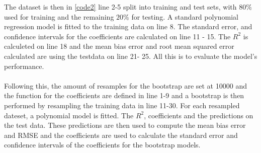 


\noindent The dataset is then in \autoref{code2} line 2-5 split into training and test sets, with $80\%$ used for training and the remaining $20\%$ for testing. A standard polynomial regression model is fitted to the training data on line 8. The standard error, and confidence intervals for the coefficients are calculated on line 11 - 15. The $R^2$ is calculeted on line 18 and  the mean bias error and root mean squared error calculated are using the testdata on line 21- 25. All this is to evaluate the model's performance.
\\\\



\noindent Following this, the amount of resamples for the bootstrap are set at 10000 and the function for the coefficients are defined in line 1-9 and a bootstrap is then performed by resampling the training data in line 11-30. For each resampled dateset, a polynomial model is fitted. The $R^2$, coefficients and the predictions on the test data. These predictions are then used to compute the mean bias error and RMSE and the coefficients are used to calculate the standard error and confidence intervals of the coefficients for the bootstrap models.
\\\\\\\\\\\\




